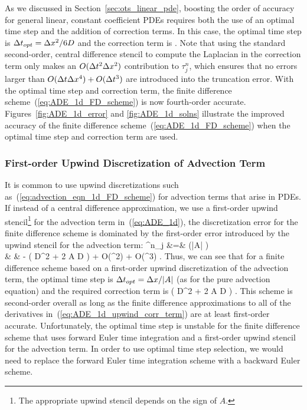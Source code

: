 \documentclass[oneeqnum,onefignum,onetabnum,onethmnum]{siamltex}
\begin{document}
As we discussed in Section~\ref{sec:ots_linear_pde}, boosting the order
of accuracy for general linear, constant coefficient PDEs requires both 
the use of an optimal time step and the addition of correction terms.  
In this case, the optimal time step is $\Delta t_{opt} = \Delta x^2/6D$ and the
correction term is 
\beq
   .
  \label{eq:ADE_1d_corr_term}
\eeq 
Note that using the standard second-order, central difference stencil to 
compute the Laplacian in the correction term only makes an 
$O(\Delta t^2 \Delta x^2)$ contribution to $\tau_j^n$, which ensures that no 
errors larger than $O(\Delta t \Delta x^4) + O(\Delta t^3)$ are introduced into the 
truncation error.
With the optimal time step and correction term, the finite difference 
scheme~(\ref{eq:ADE_1d_FD_scheme}) is now fourth-order accurate.  
Figures~\ref{fig:ADE_1d_error} and \ref{fig:ADE_1d_solns} illustrate the 
improved accuracy of the finite difference scheme~(\ref{eq:ADE_1d_FD_scheme}) 
when the optimal time step and correction term are used.


\subsubsection*{First-order Upwind Discretization of Advection Term}
It is common to use upwind discretizations such 
as~(\ref{eq:advection_eqn_1d_FD_scheme}) for advection terms that arise
in PDEs.  If instead of a central difference approximation, we use a
first-order upwind stencil\footnote{The appropriate upwind stencil depends
on the sign of $A$.} for the advection term in~(\ref{eq:ADE_1d}), the 
discretization error for the finite difference scheme is dominated by the 
first-order error introduced by the upwind stencil for the advection term:
\bea
  \tau^n_j &=&
       (|A| \dt)
  \nonumber \\
   & & 
    -  
      \left( D^2   
           + 2 A D 
      \right)
      + O(\dt \dx^2) + O(\dt^3)
  \label{eq:ADE_1d_upwind_err_eqn}.
\eea
Thus, we can see that for a finite difference scheme based on a first-order
upwind discretization of the advection term, the optimal time step is 
$\Delta t_{opt} = \Delta x/|A|$ (as for the pure advection equation) and the required
correction term is
\beq
      \left( D^2   
           + 2 A D 
      \right)
  \label{eq:ADE_1d_upwind_corr_term}.
\eeq
This scheme is second-order overall as long as the finite difference 
approximations to all of the derivatives in~(\ref{eq:ADE_1d_upwind_corr_term})
are at least first-order accurate.  Unfortunately, the optimal time step 
is unstable for the finite difference scheme that uses forward Euler time 
integration and a first-order upwind stencil for the advection term.  
In order to use optimal time step selection, we would need to replace the 
forward Euler time integration scheme with a backward Euler scheme. 
\end{document}
